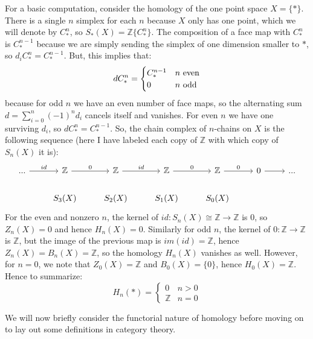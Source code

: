 \documentclass[12pt, oneside]{article}   	%
\theoremstyle{definition}
\begin{document}
For a basic computation, consider the homology of the one point space $X = \{*\}$. There is a single $n$ simplex for each 
$n$ because $X$ only has one point, which we will denote by $C_*^n$, so $S_*(X) = \mathbb Z\{C_*^n\}$. The composition 
of a face map with $C_*^n$ is $C_*^{n - 1}$ because we are simply sending the simplex of one dimension smaller to $*$, 
so $d_i C_*^n = C_*^{n - 1}$. But, this implies that:
\begin{equation}
	d C_*^n = \begin{cases}
		C_*^{n - 1} & n\textnormal{ even} \\
		0 & n\textnormal{ odd} \\
	\end{cases}
\end{equation}
because for odd $n$ we have an even number of face maps, so the alternating sum $d = \sum_{i = 0}^n (-1)^n d_i$ cancels 
itself and vanishes. For even $n$ we have one surviving $d_i$, so $d C_*^n = C_*^{n - 1}$. So, the chain complex of 
$n$-chains on $X$ is the following sequence (here I have labeled each copy of $\mathbb Z$ with which copy of $S_n(X)$ 
it is):
\begin{equation}\begin{tikzcd}
		...\arrow[r, "id"] & \mathbb Z\arrow[r, "0"] & \mathbb Z\arrow[r, "id"] & \mathbb Z\arrow[r, "0"]
		& \mathbb Z\arrow[r, "0"] & 0\arrow[r] & ... \\
		 & S_3(X) & S_2(X) & S_1(X) & S_0(X) &
\end{tikzcd}\end{equation}
For the even and nonzero $n$, the kernel of $id : S_n(X)\cong\mathbb Z\rightarrow \mathbb Z$ is 0, so $Z_n(X) = 0$ and 
hence $H_n(X) = 0$. Similarly for odd $n$, the kernel of $0 : \mathbb Z\rightarrow\mathbb Z$ is $\mathbb Z$, but the image 
of the previous map is $im(id) = \mathbb Z$, hence $Z_n(X) = B_n(X) = \mathbb Z$, so the homology $H_n(X)$ vanishes as 
well. However, for $n = 0$, we note that $Z_0(X) = \mathbb Z$ and $B_0(X) = \{0\}$, hence $H_0(X) = \mathbb Z$. 
Hence to summarize:
\begin{equation}
	H_n(*) = \begin{cases}
	0 & n > 0 \\
	\mathbb Z & n = 0
	\end{cases}
\end{equation}

We will now briefly consider the functorial nature of homology before 
moving on to lay out some definitions in category theory. 
\end{document}
